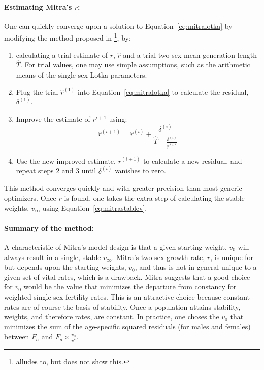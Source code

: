 \paragraph{Estimating Mitra's $r$: } One can quickly converge upon a solution
to Equation~\eqref{eq:mitralotka} by modifying the method proposed in
\citet{coale1957new}\footnote{\citet{mitra1978derivation} alludes to, but does not show this.}, 
by:
\begin{enumerate}
  \item calculating a trial estimate of $r$,
$\widehat{r}$ and a trial two-sex mean generation length
$\widehat{T}$. For trial values, one may use simple
assumptions, such as the arithmetic means of the single sex Lotka parameters.
  \item Plug the trial $\widehat{r}^{(1)}$ into Equation~\eqref{eq:mitralotka}
  to calculate the residual, $\delta ^{(1)}$.
  \item Improve the estimate of $r^{i+1}$ using:
  \begin{equation}
  \widehat{r}^{(i+1)} = \widehat{r}^{(i)} + \frac{\delta^{(i)}}{\widehat{T} -
\frac{\delta ^{(i)}}{\widehat{r}^{(i)} }}
  \end{equation}
  \item Use the new improved estimate, $r^{(i+1)}$ to calculate a new residual,
  and repeat steps 2 and 3 until $\delta^{(i)}$ vanishes to zero.
\end{enumerate}

This method converges quickly and with greater precision than most
generic optimizers. Once $r$ is found, one takes the extra step of calculating
the stable weights, $v_\infty$ using Equation~\eqref{eq:mitrastablev}.

\paragraph{Summary of the method: } A characteristic of Mitra's model design is
that a given starting weight, $v_0$ will always result in a single, stable $v_\infty$. 
Mitra's two-sex growth rate,
$r$, is unique for but depends upon the starting weights, $v_0$, and thus is not 
in general unique to a given set of vital rates, which is a drawback. Mitra
suggests that a good choice for $v_0$ would be the value that minimizes the 
departure from constancy for weighted single-sex fertility rates. This is an 
attractive choice because constant rates are of course the
basis of stability. Once a population attains stability, weights, and therefore 
rates, are constant. In practice, one choses the $v_0$ that minimizes the sum of
the age-specific squared residuals (for males and females) between $F_a$ and 
$F_a \times \tfrac{v_0}{v^\ast}$.

